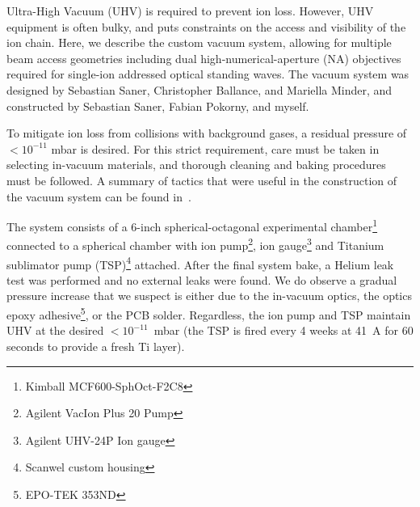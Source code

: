     Ultra-High Vacuum (UHV) is required to prevent ion loss.
    However, UHV equipment is often bulky, and puts constraints on the access
    and visibility of the ion chain. Here, we describe the custom vacuum
    system, allowing for multiple beam access geometries including dual high-numerical-aperture (NA) objectives required for single-ion addressed optical standing waves.  The vacuum system was
    designed by Sebastian Saner, Christopher Ballance, and Mariella Minder, and constructed by
    Sebastian Saner, Fabian Pokorny, and myself.

    To mitigate ion loss from collisions with background gases, a residual pressure of $<10^{-11}$ mbar is desired. For this strict
    requirement, care must be taken in selecting in-vacuum materials, and 
    thorough cleaning and baking procedures must be followed. A summary of tactics that were
    useful in the construction of the vacuum system can be found
    in~\cite{birnbaum_ultra-high_nodate, wolf_cryogenic_2019}.

    The system consists of a 6-inch spherical-octagonal
    experimental chamber\footnote{Kimball MCF600-SphOct-F2C8} connected to a
    spherical chamber with ion pump\footnote{Agilent VacIon Plus 20 Pump}, ion
    gauge\footnote{Agilent UHV-24P Ion gauge} and Titanium sublimator pump
    (TSP)\footnote{Scanwel custom housing} attached. 
    After the final system bake, a Helium leak test was performed and 
    no external leaks were found. We do observe a gradual pressure increase that we suspect is either due
    to the in-vacuum optics, the optics epoxy adhesive\footnote{EPO-TEK
    353ND}, or the PCB solder. Regardless, the ion pump and TSP
    maintain UHV at the desired $<10^{-11}$~mbar (the TSP
    is fired every 4 weeks at 41~A for 60 seconds to provide a fresh Ti layer).

